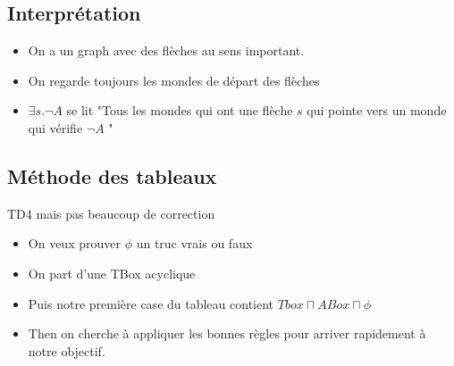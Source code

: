 \documentclass{article}
\theoremstyle{plain}%
\theoremstyle{definition}
\theoremstyle{remark}
\begin{document}
\subsection{Interprétation}
\begin{itemize}
    \item On a un graph avec des flèches au sens important.
    \item On regarde toujours les mondes de départ des flèches
    \item $ \exists s. \neg A $ se lit "Tous les mondes qui ont une flèche $ s $ qui pointe vers un monde qui vérifie $ \neg A $ "
\end{itemize}

\subsection{Méthode des tableaux}
TD4 mais pas beaucoup de correction
\begin{itemize}
    \item On veux prouver $ \phi  $  un truc vrais ou faux
    \item On part d'une TBox acyclique
    \item Puis notre première case du tableau contient $ Tbox \sqcap ABox \sqcap \phi  $ 
    \item Then on cherche à appliquer les bonnes règles pour arriver rapidement à notre objectif.
\end{itemize}
\end{document}
